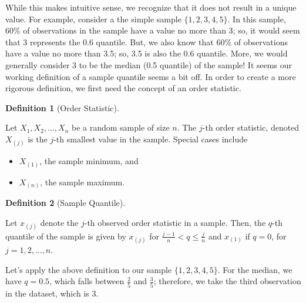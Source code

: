 \documentclass[
  letterpaper,
  DIV=11,
  numbers=noendperiod]{scrreprt}
\providecommand{\tightlist}{%
  \setlength{\itemsep}{0pt}\setlength{\parskip}{0pt}}\usepackage{longtable,booktabs,array}
\theoremstyle{definition}
\newtheorem{definition}{Definition}[chapter]
\theoremstyle{plain}
\theoremstyle{definition}
\theoremstyle{remark}
\begin{document}
While this makes intuitive sense, we recognize that it does not result
in a unique value. For example, consider a the simple sample
\(\{1, 2, 3, 4, 5\}\). In this sample, 60\% of observations in the
sample have a value no more than 3; so, it would seem that 3 represents
the 0.6 quantile. But, we also know that 60\% of observations have a
value no more than 3.5; so, 3.5 is also the 0.6 quantile. More, we would
generally consider 3 to be the median (0.5 quantile) of the sample! It
seems our working definition of a sample quantile seems a bit off. In
order to create a more rigorous definition, we first need the concept of
an order statistic.

\begin{definition}[Order
Statistic]\protect\hypertarget{def-order-statistic}{}\label{def-order-statistic}

Let \(X_1, X_2, \dotsc, X_n\) be a random sample of size \(n\). The
\(j\)-th order statistic, denoted \(X_{(j)}\) is the \(j\)-th smallest
value in the sample. Special cases include

\begin{itemize}
\tightlist
\item
  \(X_{(1)}\), the sample minimum, and
\item
  \(X_{(n)}\), the sample maximum.
\end{itemize}

\end{definition}

\begin{definition}[Sample
Quantile]\protect\hypertarget{def-sample-quantile}{}\label{def-sample-quantile}

Let \(x_{(j)}\) denote the \(j\)-th observed order statistic in a
sample. Then, the \(q\)-th quantile of the sample is given by
\(x_{(j)}\) for \(\frac{j-1}{n} < q \leq \frac{j}{n}\) and \(x_{(1)}\)
if \(q = 0\), for \(j=1,2,\dotsc,n\).

\end{definition}

Let's apply the above definition to our sample \(\{1, 2, 3, 4, 5\}\).
For the median, we have \(q = 0.5\), which falls between \(\frac{2}{5}\)
and \(\frac{3}{5}\); therefore, we take the third observation in the
dataset, which is 3.
\end{document}
